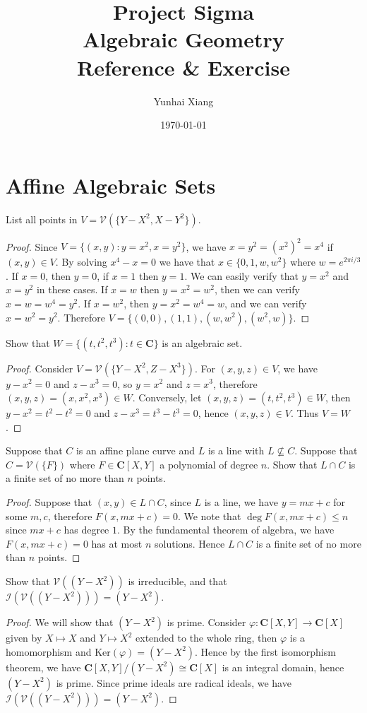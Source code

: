 \documentclass[11pt]{book}
\title{
\vspace{-2.0cm}
\Large{Project Sigma}\\
\vspace{1cm}
\huge{\bf{Algebraic Geometry}}\\
\vspace{0.4cm}
\large{Reference \& Exercise}
\vspace{3cm}}
\author{Yunhai Xiang}
\date{\today}
\begin{document}
\maketitle
\doublespacing
\tableofcontents
\singlespacing
\newpage
\chapter{Affine Algebraic Sets}
\begin{problem}List all points in $V=\mathcal{V}(\{Y-X^2,X-Y^2\})$.
\begin{proof}Since $V=\{(x,y):y=x^2,x=y^2\}$, we have $x=y^2=(x^2)^2=x^4$ if $(x,y)\in V$. By solving $x^4-x=0$ we have that $x\in \{0,1,w,w^2\}$ where $w=e^{2\pi i/3}$. If $x=0$, then $y=0$, if $x=1$ then $y=1$. We can easily verify that $y=x^2$ and $x=y^2$ in these cases. If $x=w$ then $y=x^2=w^2$, then we can verify $x=w=w^4=y^2$. If $x=w^2$, then $y=x^2=w^4=w$, and we can verify $x=w^2=y^2$. Therefore $V=\{(0,0),(1,1),(w,w^2),(w^2,w)\}$.
\end{proof}
\end{problem}
\begin{problem}Show that $W=\{(t,t^2,t^3):t\in\mathbf C\}$ is an algebraic set.
\begin{proof}Consider $V=\mathcal{V}(\{Y-X^2,Z-X^3\})$. For $(x,y,z)\in V$, we have $y-x^2=0$ and $z-x^3=0$, so $y=x^2$ and $z=x^3$, therefore $(x,y,z)=(x,x^2,x^3)\in W$. Conversely, let $(x,y,z)=(t,t^2,t^3)\in W$, then $y-x^2=t^2-t^2=0$ and $z-x^3=t^3-t^3=0$, hence $(x,y,z)\in V$. Thus $V=W$.
\end{proof}
\end{problem}
\begin{problem}
Suppose that $C$ is an affine plane curve and $L$ is a line with $L\not\subseteq C$. Suppose that $C=\mathcal{V}(\{F\})$ where $F\in \mathbf C[X,Y]$ a polynomial of degree $n$. Show that $L\cap C$ is a finite set of no more than $n$ points. 
\begin{proof}
Suppose that $(x,y)\in L\cap C$, since $L$ is a line, we have $y=mx+c$ for some $m,c$, therefore $F(x,mx+c)=0$. We note that $\deg F(x,mx+c)\le n$ since $mx+c$ has degree $1$. By the fundamental theorem of algebra, we have $F(x,mx+c)=0$ has at most $n$ solutions. Hence $L\cap C$ is a finite set of no more than $n$ points. 
\end{proof}
\end{problem}
\begin{problem}Show that $\mathcal{V}((Y-X^2))$ is irreducible, and that $\mathcal{I}(\mathcal{V}((Y-X^2)))=(Y-X^2)$.
\begin{proof}
We will show that $(Y-X^2)$ is prime. Consider $\varphi:\mathbf C[X,Y]\rightarrow \mathbf C[X]$ given by $X\mapsto X$ and $Y\mapsto X^2$ extended to the whole ring, then $\varphi$ is a homomorphism and $\mathrm{Ker}(\varphi)=(Y-X^2)$. Hence by the first isomorphism theorem, we have $\mathbf C[X,Y]/(Y-X^2)\cong \mathbf C[X]$ is an integral domain, hence $(Y-X^2)$ is prime. Since prime ideals are radical ideals, we have $\mathcal{I}(\mathcal{V}((Y-X^2)))=(Y-X^2)$.
\end{proof}
\end{problem}
\end{document}
